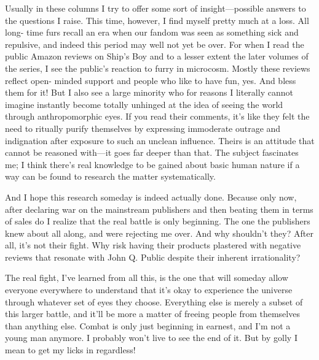 Usually in these columns I try to offer some sort of insight—possible answers to the questions I raise. This time, however, I find myself pretty much at a loss. All long- time furs recall an era when our fandom was seen as something sick and repulsive, and indeed this period may well not yet be over. For when I read the public Amazon reviews on Ship's Boy and to a lesser extent the later volumes of the series, I see the public's reaction to furry in microcosm. Mostly these reviews reflect open- minded support and people who like to have fun, yes. And bless them for it! But I also see a large minority who for reasons I literally cannot imagine instantly become totally unhinged at the idea of seeing the world through anthropomorphic eyes. If you read their comments, it's like they felt the need to ritually purify themselves by expressing immoderate outrage and indignation after exposure to such an unclean influence. Theirs is an attitude that cannot be reasoned with—it goes far deeper than that. The subject fascinates me; I think there's real knowledge to be gained about basic human nature if a way can be found to research the matter systematically.

And I hope this research someday is indeed actually done. Because only now, after declaring war on the mainstream publishers and then beating them in terms of sales do I realize that the real battle is only beginning. The one the publishers knew about all along, and were rejecting me over. And why shouldn't they? After all, it's not their fight. Why risk having their products plastered with negative reviews that resonate with John Q. Public despite their inherent irrationality?

The real fight, I've learned from all this, is the one that will someday allow everyone everywhere to understand that it's okay to experience the universe through whatever set of eyes they choose. Everything else is merely a subset of this larger battle, and it'll be more a matter of freeing people from themselves than anything else. Combat is only just beginning in earnest, and I'm not a young man anymore. I probably won't live to see the end of it. But by golly I mean to get my licks in regardless!
